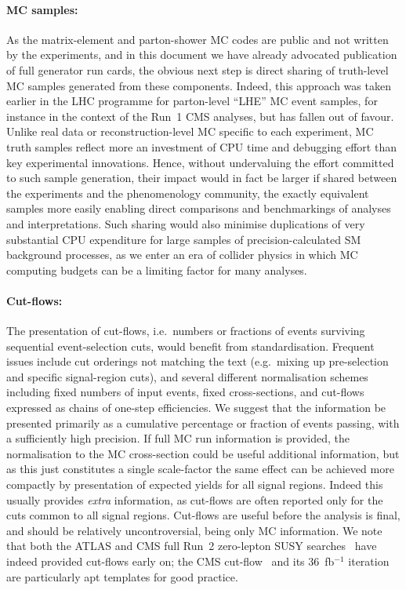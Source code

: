 \documentclass[a4paper,aps,prd,longbibliography,notitlepage,showpacs,amsmath,amssymb,superscriptaddress,nofootinbib,floatfix,11pt,preprintnumbers]{revtex4-1-mod}
\newcommand{\ie}{i.e.\xspace}
\newcommand{\eg}{e.g.\xspace}
\renewcommand{\emph}[1]{\textit{#1}}
\begin{document}
\paragraph{MC samples:} As the matrix-element and parton-shower MC codes are public and not written by the experiments, and in this document we have already advocated publication of full generator run cards, the obvious next step is direct sharing of truth-level MC samples generated from these components.  Indeed, this approach was taken earlier in the LHC programme for parton-level ``\textsf{LHE}'' MC event samples, for instance in the context of the Run~1 CMS analyses, but has fallen out of favour. Unlike real data or reconstruction-level MC specific to each experiment, MC truth samples reflect more an investment of CPU time and debugging effort than key experimental innovations. Hence, without undervaluing the effort committed to such sample generation, their impact would in fact be larger if shared between the experiments and the phenomenology community, the exactly equivalent samples more easily enabling direct comparisons and benchmarkings of analyses and interpretations. Such sharing would also minimise duplications of very substantial CPU expenditure for large samples of precision-calculated SM background processes, as we enter an era of collider physics in which MC computing budgets can be a limiting factor for many analyses.\\

\paragraph{Cut-flows:}
The presentation of cut-flows, \ie~numbers or fractions of events surviving sequential event-selection cuts, would benefit from standardisation. Frequent issues include cut orderings not matching the text (\eg~mixing up pre-selection and specific signal-region cuts), and several different normalisation schemes including fixed numbers of input events, fixed cross-sections, and cut-flows expressed as chains of one-step efficiencies. We suggest that the information be presented primarily as a cumulative percentage or fraction of events passing, with a sufficiently high precision. If full MC run information is provided, the normalisation to the MC cross-section could be useful additional information, but as this just constitutes a single scale-factor the same effect can be achieved more compactly by presentation of expected yields for all signal regions. Indeed this usually provides \emph{extra} information, as cut-flows are often reported only for the cuts common to all signal regions. Cut-flows are useful before the analysis is final, and should be relatively uncontroversial, being only MC information. We note that both the ATLAS and CMS full Run~2 zero-lepton SUSY searches~\cite{ATLAS-CONF-2019-040,Sirunyan:2019ctn} have indeed provided cut-flows early on; the CMS cut-flow~\cite{Sirunyan:2019ctn} and its 36~fb$^{-1}$ iteration~\cite{Sirunyan:2017kqq} are particularly apt templates for good  practice.
\end{document}
